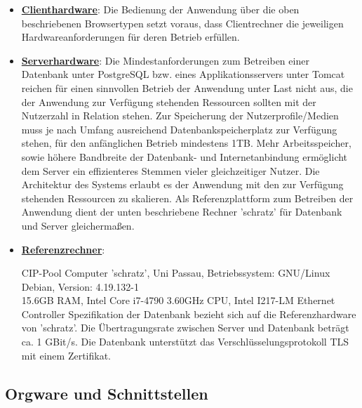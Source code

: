 \documentclass{article}
\begin{document}
\begin{itemize}
\item \underline{\textbf{Clienthardware}}: \linebreak
Die Bedienung der Anwendung über die oben beschriebenen Browsertypen setzt voraus, dass Clientrechner die jeweiligen Hardwareanforderungen für deren Betrieb erfüllen.
\item \underline{\textbf{Serverhardware}}: \linebreak
Die Mindestanforderungen zum Betreiben einer Datenbank unter PostgreSQL bzw. eines Applikationsservers unter Tomcat reichen für einen sinnvollen Betrieb der Anwendung unter Last nicht aus, die der Anwendung zur Verfügung stehenden Ressourcen sollten mit der Nutzerzahl in Relation stehen. Zur Speicherung der Nutzerprofile/Medien muss je nach Umfang ausreichend Datenbankspeicherplatz zur Verfügung stehen, für den anfänglichen Betrieb mindestens 1TB. Mehr Arbeitsspeicher, sowie höhere Bandbreite der Datenbank- und Internetanbindung ermöglicht dem Server ein effizienteres Stemmen vieler gleichzeitiger Nutzer. Die Architektur des Systems erlaubt es der Anwendung mit den zur Verfügung stehenden Ressourcen zu skalieren. Als Referenzplattform zum Betreiben der Anwendung dient der unten beschriebene Rechner 'schratz' für Datenbank und Server gleichermaßen.
\item \underline{\textbf{Referenzrechner}}:
\begin{flushleft}
CIP-Pool Computer 'schratz', Uni Passau, Betriebssystem: GNU/Linux Debian, Version: 4.19.132-1\\ 15.6GB RAM, Intel Core i7-4790 3.60GHz CPU, Intel I217-LM Ethernet Controller \linebreak
Spezifikation der Datenbank bezieht sich auf die Referenzhardware von 'schratz'. Die Übertragungsrate zwischen Server und Datenbank beträgt ca. 1 GBit/s. Die Datenbank unterstützt das Verschlüsselungsprotokoll TLS mit einem Zertifikat. \linebreak
\end{flushleft}
\end{itemize}

\subsection{Orgware und Schnittstellen}
\end{document}
